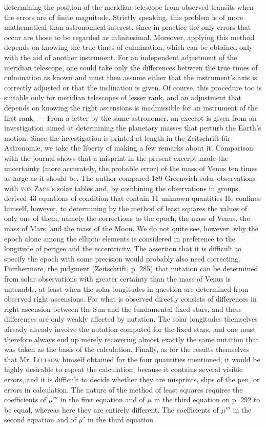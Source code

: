 determining the position of the meridian telescope from observed transits when the errors are of finite magnitude. Strictly speaking, this problem is of more mathematical than astronomical interest, since in practice the only errors that occur are those to be regarded as infinitesimal. Moreover, applying this method depends on knowing the true times of culmination, which can be obtained only with the aid of another instrument. For an independent adjustment of the meridian telescope, one could take only the differences between the true times of culmination as known and must then assume either that the instrument's axis is correctly adjusted or that the inclination is given. Of course, this procedure too is suitable only for meridian telescopes of lesser rank, and an adjustment that depends on knowing the right ascensions is inadmissible for an instrument of the first rank. --- From a letter by the same astronomer, an excerpt is given from an investigation aimed at determining the planetary masses that perturb the Earth's motion. Since the investigation is printed at length in the Zeitschrift für Astronomie, we take the liberty of making a few remarks about it. Comparison with the journal shows that a misprint in the present excerpt made the uncertainty (more accurately, the probable error) of the mass of Venus ten times as large as it should be. The author compared 189 Greenwich solar observations with \textsc{von Zach}'s solar tables and, by combining the observations in groups, derived 43 equations of condition that contain 11 unknown quantities He confines himself, however, to determining by the method of least squares the values of only one of them, namely the corrections to the epoch, the mass of Venus, the mass of Mars, and the mass of the Moon. We do not quite see, however, why the epoch alone among the elliptic elements is considered in preference to the longitude of perigee and the eccentricity. The assertion that it is difficult to specify the epoch with some precision would probably also need correcting. Furthermore, the judgment (Zeitschrift, p. 285) that nutation can be determined from solar observations with greater certainty than the mass of Venus is untenable, at least when the solar longitudes in question are determined from observed right ascensions. For what is observed directly consists of differences in right ascension between the Sun and the fundamental fixed stars, and these differences are only weakly affected by nutation. The solar longitudes themselves already already involve the nutation computed for the fixed stars, and one must therefore always end up merely recovering almost exactly the same nutation that was taken as the basis of the calculation. Finally, as for the results themselves that Mr. \textsc{Littrow} himself obtained for the four quantities mentioned, it would be highly desirable to repeat the calculation, because it contains several visible errors, and it is difficult to decide whether they are misprints, slips of the pen, or errors in calculation. The nature of the method of least squares requires the coefficients of $\mu'''$ in the first equation and of $\mu$ in the third equation on p. 292 to be equal, whereas here they are entirely different. The coefficients of $\mu'''$ in the second equation and of $\mu'$ in the third equation 